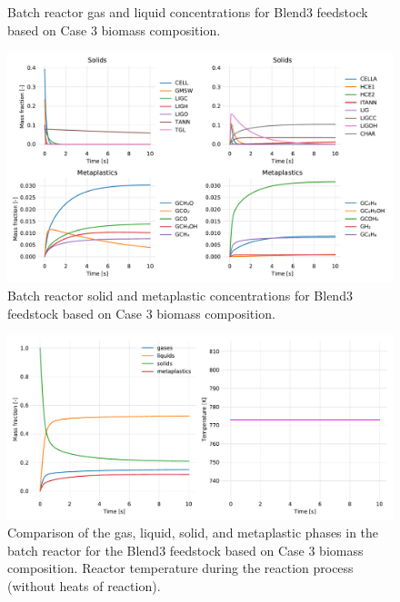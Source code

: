 \begin{figure}[H]
    \centering
    \caption{Batch reactor gas and liquid concentrations for Blend3 feedstock based on Case 3 biomass composition.}
    \label{fig:blend3-case3-gases-liquids}
\end{figure}

\begin{figure}[H]
    \centering
    \includegraphics[width=\textwidth]{figures/blend3-case3-solids-meta.pdf}
    \caption{Batch reactor solid and metaplastic concentrations for Blend3 feedstock based on Case 3 biomass composition.}
    \label{fig:blend3-case3-solids-meta}
\end{figure}

\begin{figure}[H]
    \centering
    \includegraphics[width=\textwidth]{figures/blend3-case3-phases-temp.pdf}
    \caption{Comparison of the gas, liquid, solid, and metaplastic phases in the batch reactor for the Blend3 feedstock based on Case 3 biomass composition. Reactor temperature during the reaction process (without heats of reaction).}
    \label{fig:blend3-case3-phases-temp}
\end{figure}

